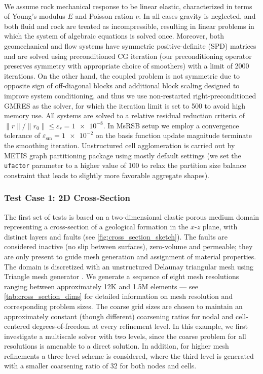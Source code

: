 \paragraph{}
We assume rock mechanical response to be linear elastic, characterized in terms of Young's modulus $E$ and Poisson ration $\nu$.   In all cases gravity is neglected, and both fluid and rock are treated as incompressible, resulting in linear problems in which the system of algebraic equations is solved once.   Moreover, both geomechanical and flow systems have symmetric positive-definite (SPD) matrices and are solved using preconditioned CG iteration (our preconditioning operator preserves symmetry with appropriate choice of smoothers) with a limit of 2000 iterations.   On the other hand, the coupled problem is not symmetric due to opposite sign of off-diagonal blocks and additional block scaling designed to improve system conditioning, and thus we use non-restarted right-preconditioned GMRES as the solver, for which the iteration limit is set to 500 to avoid high memory use.   All systems are solved to a relative residual reduction criteria of $\|r\|/\|r_0\| \leq \varepsilon_r = \num{1e-8}$.   In MsRSB setup we employ a convergence tolerance of $\varepsilon_{\text{sm}} = \num{1e-2}$ on the basis function update magnitude terminate the smoothing iteration.    Unstructured cell agglomeration is carried out by METIS \cite{Karypis1999} graph partitioning package using mostly default settings (we set the \texttt{ufactor} parameter to a higher value of 100 to relax the partition size balance constraint that leads to slightly more favorable aggregate shapes).

\subsubsection{Test Case 1: 2D Cross-Section}

The first set of tests is based on a two-dimensional elastic porous medium domain representing a cross-section of a geological formation in the $x$-$z$ plane, with distinct layers and faults (see \cref{fig:cross_section_sketch}).   The faults are considered inactive (no slip between surfaces), zero-volume and permeable; they are only present to guide mesh generation and assignment of material properties.   The domain is discretized with an unstructured Delaunay triangular mesh using Triangle mesh generator \cite{Shewchuk1996}.   We generate a sequence of eight mesh resolutions ranging between approximately 12K and 1.5M elements --- see \cref{tab:cross_section_dims} for detailed information on mesh resolution and corresponding problem sizes.   The coarse grid sizes are chosen to maintain an approximately constant (though different) coarsening ratios for nodal and cell-centered degrees-of-freedom at every refinement level.   In this example, we first investigate a multiscale solver with two levels, since the coarse problem for all resolutions is amenable to a direct solution.   In addition, for higher mesh refinements a three-level scheme is considered, where the third level is generated with a smaller coarsening ratio of 32 for both nodes and cells.

